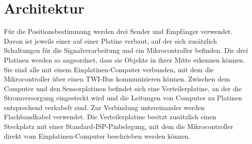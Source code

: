 \section{Architektur} %
Für die Positionsbestimmung werden drei Sender und Empfänger verwendet. Davon ist jeweils einer auf einer Platine verbaut, auf der sich zusätzlich Schaltungen für die Signalverarbeitung und ein Mikrocontroller befinden. Die drei Platinen werden so angeordnet, dass sie Objekte in ihrer Mitte erkennen können. Sie sind alle mit einem Einplatinen-Computer verbunden, mit dem die Mikrocontroller über einen \ac{TWI}-Bus kommunizieren können. Zwischen dem Computer und den Sensorplatinen befindet sich eine Verteilerplatine, an der die Stromversorgung eingesteckt wird und die Leitungen von Computer zu Platinen entsprechend verkabelt sind.
Zur Verbindung untereinander werden Flachbandkabel verwendet. Die Verteilerplatine besitzt zusätzlich einen Steckplatz mit einer Standard-\ac{ISP}-Pinbelegung, mit dem die Mikrocontroller direkt vom Einplatinen-Computer beschrieben werden können.\\
